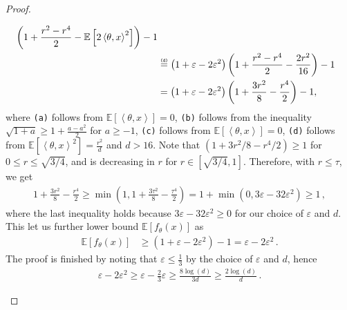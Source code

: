 \documentclass[letter, 12pt]{report}
\newcommand{\explan}[1]{\stackrel{\text{\tiny \texttt{#1}}}}
\newcommand{\ip}[1]{\left \langle #1 \right \rangle}
\newcommand{\paren}[1]{\left( #1 \right)}
\newcommand{\brak}[1]{\left[ #1 \right]}
\newcommand{\E}{\mathbb E}
\newcommand{\1}{\mathbf{1}}
\renewcommand{\epsilon}{\varepsilon}
\theoremstyle{plain}
\theoremstyle{definition}
\theoremstyle{remark}
\begin{document}
\begin{proof}
\begin{enumcases}
\begin{align*}
{            }
            \paren{
                1
                +
                \frac{
                    r^2
                    -
                    r^4
                }{2}
                -
                \E\brak{
                    2\ip{\theta, x}^2
                }
            }
            - 1
            \\
             &
            \explan{(d)}
            =
            \paren{
                1 + \epsilon - 2\epsilon^2
            }
            \paren{
                1
                +
                \frac{
                    r^2
                    -
                    r^4
                }{2}
                -
                \frac{2r^2}{16}
            }
            - 1
            \\
             &
            =
            \paren{
                1 + \epsilon - 2\epsilon^2
            }
            \paren{
                1
                +
                \frac{3r^2}{8}
                -
                \frac{r^4}{2}
            }
            - 1,
        \end{align*}
        where \texttt{(a)} follows from
        $\E\brak{\ip{\theta, x}} = 0$,
        \texttt{(b)} follows from the inequality
        $\sqrt{1 + a} \geq 1 + \frac{a - a^2}{2}$ for $a \geq -1$,
        \texttt{(c)} follows from
        $\E\brak{\ip{\theta, x}} = 0$,
        \texttt{(d)} follows from
        $\E[\ip{\theta, x}^2] = \frac{r^2}{d}$
        and $d>16$.
        Note that $(1 + 3r^2/8 - r^4/2) \geq 1$
        for $0\leq r \leq \sqrt{3/4}$,
        and is decreasing in $r$
        for $r \in [\sqrt{3/4}, 1]$.
        Therefore, with $r \leq \tau$, we get
        \begin{align*}
            1 + \frac{3r^2}{8} - \frac{r^4}{2}
            \geq
            \min(1, 1 + \frac{3\tau^2}{8} - \frac{\tau^4}{2})
            =
            1 + \min(0, 3\epsilon - 32\epsilon^2)
            \geq 1
            \,,
        \end{align*}
        where the last inequality holds because $3\epsilon - 32\epsilon^2 \geq 0$ for our choice of $\epsilon$ and $d$.
        This let us further lower bound $\E[f_\theta(x)]$ as
        \begin{align*}
            \E\brak{
                f_\theta(x)
            }
             & \geq
            \paren{
                1 + \epsilon - 2\epsilon^2
            }
            - 1
            = \epsilon - 2\epsilon^2\,.
        \end{align*}
        The proof is finished by noting that
        $\epsilon \leq \tfrac{1}{3}$ by the choice of $\epsilon$ and $d$, hence
        \begin{align*}
            \epsilon - 2\epsilon^2
            \geq
            \epsilon - \frac23\epsilon
            \geq
            \frac{8\log(d)}{3d}
            \geq \frac{2\log(d)}{d}
            \,.
        \end{align*}
    \end{enumcases}
\end{proof}
\end{document}
